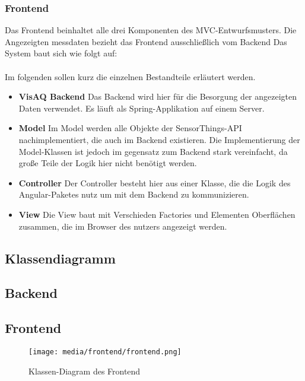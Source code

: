 \subsubsection{Frontend}
Das Frontend beinhaltet alle drei Komponenten des \gls{MVC}-Entwurfsmusters. Die Angezeigten messdaten bezieht das \softwarename Frontend ausschließlich vom \softwarename Backend
Das System baut sich wie folgt auf:
\\

\\
Im folgenden sollen kurz die einzelnen Bestandteile erläutert werden.
\begin{itemize}
    \item \textbf{VisAQ Backend} Das \softwarename Backend wird hier für die Besorgung der angezeigten Daten verwendet. Es läuft als Spring-Applikation auf einem Server.
    \item \textbf{Model} Im Model werden alle Objekte der SensorThings-API nachimplementiert, die auch im Backend existieren.
    Die Implementierung der Model-Klassen ist jedoch im gegensatz zum Backend stark vereinfacht, da große Teile der Logik hier nicht benötigt werden.
    \item \textbf{Controller} Der Controller besteht hier aus einer Klasse, die die Logik des Angular-Paketes nutz um mit dem Backend zu kommunizieren.
    \item \textbf{View} Die View baut mit Verschieden Factories und Elementen Oberflächen zusammen, die im Browser des nutzers angezeigt werden.
\end{itemize}

\subsection{Klassendiagramm}
\subsection{Backend}
\clearpage
\begin{figure} [h]
\end{figure}
\clearpage
\subsection{Frontend}
\begin{figure} [h]
    \texttt{[image: media/frontend/frontend.png]}
    \caption{Klassen-Diagram des Frontend}
\end{figure}